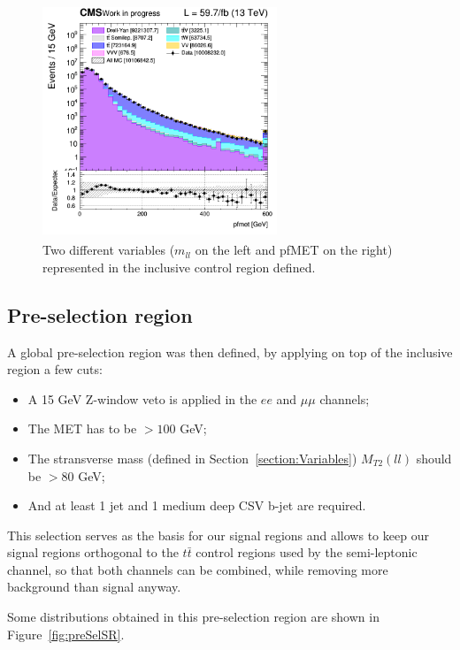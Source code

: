 \documentclass[a4paper, 10pt, openright]{report}
\begin{document}
\begin{figure}[htbp]
{\begin{minipage}[b]{.48\textwidth}
\end{minipage}\hfill
\begin{minipage}[b]{.48\textwidth}
\includegraphics[width=7cm, height=7cm]{figs/2018/log_cratio_inclusiveCR_ll_METcorrected_pt.png}
\end{minipage} \hfill
}
\caption{Two different variables ($m_{ll}$ on the left and pf\ac{MET} on the right) represented in the inclusive control region defined.}
\label{fig:inclusiveCR}
\end{figure}

\subsection{Pre-selection region}

A global pre-selection region was then defined, by applying on top of the inclusive region a few cuts:
\begin{itemize}
\item A 15 GeV Z-window veto is applied in the $ee$ and $\mu \mu$ channels;
\item The \ac{MET} has to be $> 100$ GeV;
\item The stransverse mass (defined in Section~\ref{section:Variables}) $M_{T2}(ll)$ should be $> 80$ GeV;
\item And at least 1 jet and 1 medium deep CSV b-jet are required.
\end{itemize}

This selection serves as the basis for our signal regions and  allows to keep our signal regions orthogonal to the $t \bar t$ control regions used by the semi-leptonic channel, so that both channels can be combined, while removing more background than signal anyway.

Some distributions obtained in this pre-selection region are shown in Figure~\ref{fig:preSelSR}.
\end{document}
